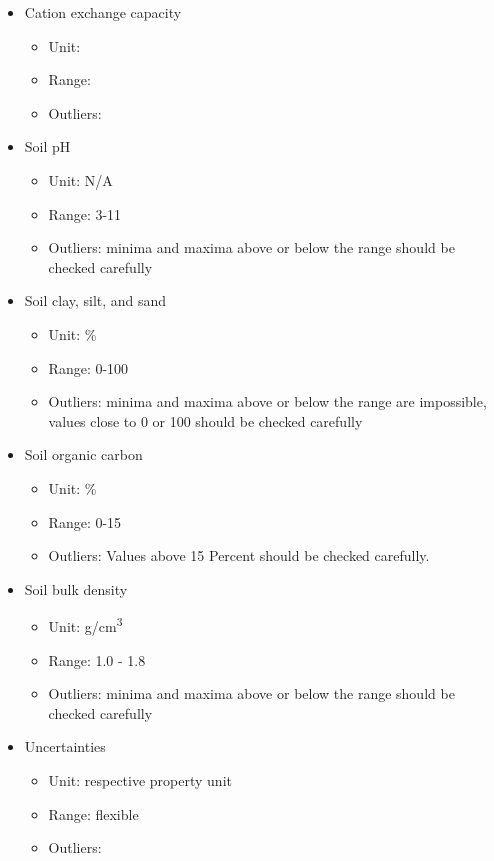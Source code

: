 \documentclass[
  10pt,
  b5paper,
  oneside]{book}
\providecommand{\tightlist}{%
  \setlength{\itemsep}{0pt}\setlength{\parskip}{0pt}}
\begin{document}
\begin{itemize}
\tightlist
\item
  Cation exchange capacity

  \begin{itemize}
  \tightlist
  \item
    Unit:
  \item
    Range:
  \item
    Outliers:
  \end{itemize}
\item
  Soil pH

  \begin{itemize}
  \tightlist
  \item
    Unit: N/A
  \item
    Range: 3-11
  \item
    Outliers: minima and maxima above or below the range should be checked carefully
  \end{itemize}
\item
  Soil clay, silt, and sand

  \begin{itemize}
  \tightlist
  \item
    Unit: \%
  \item
    Range: 0-100
  \item
    Outliers: minima and maxima above or below the range are impossible, values close to 0 or 100 should be checked carefully
  \end{itemize}
\item
  Soil organic carbon

  \begin{itemize}
  \tightlist
  \item
    Unit: \%
  \item
    Range: 0-15
  \item
    Outliers: Values above 15 Percent should be checked carefully.
  \end{itemize}
\item
  Soil bulk density

  \begin{itemize}
  \tightlist
  \item
    Unit: g/cm\textsuperscript{3}
  \item
    Range: 1.0 - 1.8
  \item
    Outliers: minima and maxima above or below the range should be checked carefully
  \end{itemize}
\item
  Uncertainties

  \begin{itemize}
  \tightlist
  \item
    Unit: respective property unit
  \item
    Range: flexible
  \item
    Outliers:
  \end{itemize}
\end{itemize}
\end{document}
